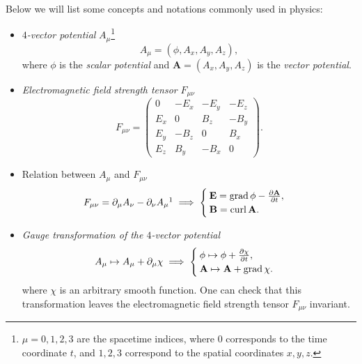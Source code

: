 Below we will list some concepts and notations commonly used in physics:
\begin{itemize}
    \item \textit{$4$-vector potential} $A_\mu$\footnote{$\mu=0,1,2,3$ are the spacetime indices, 
    where $0$ corresponds to the time coordinate $t$, 
    and $1,2,3$ correspond to the spatial coordinates $x,y,z$.} 
    \begin{equation*}
        A_\mu = (\phi, A_x, A_y, A_z),
    \end{equation*}
    where $\phi$ is the \textit{scalar potential} and $\mathbf{A} = (A_x, A_y, A_z)$ is the \textit{vector potential}. 
    \item \textit{Electromagnetic field strength tensor} $F_{\mu\nu}$ 
    \begin{equation*}
        F_{\mu\nu} = \begin{pmatrix}
            0 & -E_x & -E_y & -E_z \\
            E_x & 0 & B_z & -B_y \\
            E_y & -B_z & 0 & B_x \\
            E_z & B_y & -B_x & 0
        \end{pmatrix}.
    \end{equation*}
    \item Relation between $A_\mu$ and $F_{\mu\nu}$
    \begin{equation*}
        F_{\mu\nu} = \p_\mu A_\nu - \p_\nu A_\mu \footnotemark
        \implies
        \begin{cases}
            \mathbf{E} = \mathrm{grad}\, \phi - \frac{\partial \mathbf{A}}{\partial t}, \\
            \mathbf{B} = \mathrm{curl}\, \mathbf{A}.
        \end{cases} 
    \end{equation*}
    \item \textit{Gauge transformation of the $4$-vector potential}
    \begin{equation*}
        A_\mu \mapsto A_\mu + \partial_\mu \chi \implies
        \begin{cases}
            \phi \mapsto \phi + \frac{\partial \chi}{\partial t}, \\
            \mathbf{A} \mapsto \mathbf{A} + \mathrm{grad}\, \chi.
        \end{cases}
    \end{equation*}
    where $\chi$ is an arbitrary smooth function. 
    One can check that this transformation leaves the electromagnetic field strength tensor $F_{\mu\nu}$ invariant.
\end{itemize}


